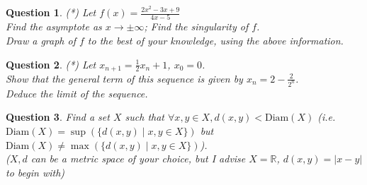 \documentclass[]{article}
\newtheorem{question}{Question}
\newcommand{\R}{\mathbb{R}}
\newcommand{\abs}[1]{| #1 |}
\begin{document}
\begin{question}
	(*)	Let $f(x) = \frac{2x^2-3x+9}{4x-5}$\\
	Find the asymptote as $x \to \pm\infty$; Find the singularity of $f$.\\
	Draw a graph of $f$ to the best of your knowledge, using the above information.
\end{question}

\begin{question}
	(*) Let $x_{n+1}=\frac{1}{2}x_n+1$, $x_0=0$.\\
	Show that the general term of this sequence is given by $x_n=2-\frac{2}{2^n}$.\\
	Deduce the limit of the sequence.
\end{question}

\begin{question}
	Find a set $X$ such that $\forall x,y \in X, d(x,y)<\text{Diam}(X)$ (i.e. $\text{Diam}(X)=\sup(\{d(x,y) \mid x,y \in X\})$ but $\text{Diam}(X) \neq \max(\{d(x,y) \mid x,y \in X\})$).\\
	($X,d$ can be a metric space of your choice, but I advise $X=\R$, $d(x,y)=\abs{x-y}$ to begin with)
\end{question}
\end{document}
